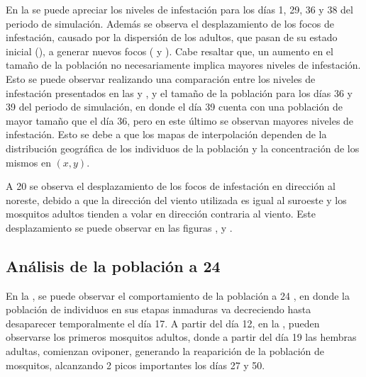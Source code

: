 En la  se puede apreciar los niveles de infestación para los
días 1, 29, 36 y 38 del periodo de simulación. Además se observa el desplazamiento de los focos de
infestación, causado por la dispersión de los adultos, que pasan de su estado inicial
(), a generar nuevos focos
( y ). Cabe resaltar
que, un aumento en el tamaño de la población no necesariamente implica mayores niveles de
infestación. Esto se puede observar realizando una comparación entre los niveles de infestación
presentados en las  y ,
y el tamaño de la población para los días 36 y 39 del periodo de simulación, en donde el día 39
cuenta con una población de mayor tamaño que el día 36, pero en este último se observan mayores
niveles de infestación. Esto se debe a que los mapas de interpolación dependen de la distribución
geográfica de los individuos de la población y la concentración de los mismos en $(x,y)$.

A 20 \textcelsius se observa el desplazamiento de los focos de infestación en dirección al
noreste, debido a que la dirección del viento utilizada es igual al suroeste y los mosquitos
adultos tienden a volar en dirección contraria al viento. Este desplazamiento se puede observar en
las figuras ,  y
.

\subsection{Análisis de la población a 24\textcelsius}
En la , se puede observar el comportamiento de la población a
24 \textcelsius, en donde la población de individuos en sus etapas inmaduras va decreciendo hasta
desaparecer temporalmente el día 17. A partir del día 12, en la
, pueden observarse los primeros mosquitos adultos, donde a
partir del día 19 las hembras adultas, comienzan oviponer, generando la reaparición de la
población de mosquitos, alcanzando 2 picos importantes los días 27 y 50.

